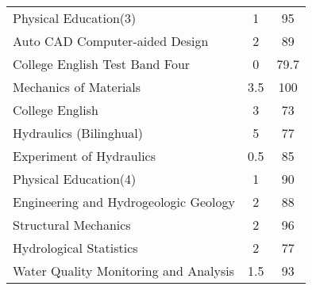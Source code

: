 \documentclass[a4paper,10pt,final]{scrartcl}
\begin{document}
\begin{center}
\begin{longtable}{lcc}
Physical Education(3)                                                                                                                   & 1   & 95   \\
Auto CAD Computer-aided Design                                                                                                          & 2   & 89   \\
College English Test Band Four                                                                                                          & 0   & 79.7 \\
Mechanics of Materials                                                                                                                  & 3.5 & 100  \\
College English                                                                                                                         & 3   & 73   \\
Hydraulics (Bilinghual)                                                                                                                 & 5   & 77   \\
Experiment of Hydraulics                                                                                                                & 0.5 & 85   \\
Physical Education(4)                                                                                                                   & 1   & 90   \\
Engineering and Hydrogeologic Geology                                                                                                   & 2   & 88   \\
Structural Mechanics                                                                                                                    & 2   & 96   \\
Hydrological Statistics                                                                                                                 & 2   & 77   \\
Water Quality Monitoring and Analysis                                                                                                   & 1.5 & 93   \\
 

\end{longtable}
\end{center}
\end{document}
